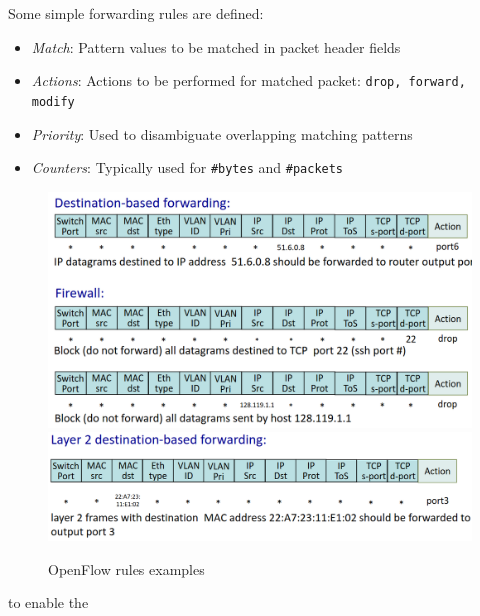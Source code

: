 \begin{paracol}{2}
   \colfill
   Some simple forwarding rules are defined:
   \begin{itemize}
      \item \textit{Match}:
      Pattern values to be matched in packet header fields
      \item \textit{Actions}:
      Actions to be performed for matched packet: \texttt{drop, forward, modify} 
      \item \textit{Priority}:
      Used to disambiguate overlapping matching patterns
      \item \textit{Counters}:
      Typically used for \texttt{\#bytes} and \texttt{\#packets}   
   \end{itemize}
   \colfill

   \switchcolumn
   \begin{figure}[htbp]
      \centering
      \includegraphics{images/openflow_rulesexamples.png}\\
      \includegraphics{images/openflow_rulesexamples1.png}
      \caption{OpenFlow rules examples}
      \label{fig:openflow_rulesexamples}
   \end{figure}to enable the
\end{paracol}


